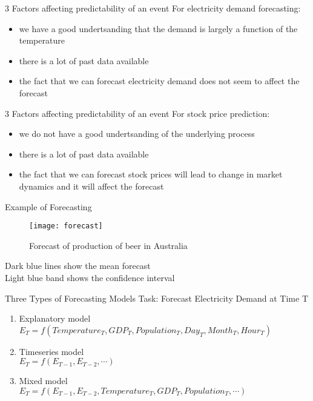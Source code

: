 \documentclass{beamer}
\begin{document}
\begin{frame}{3 Factors affecting predictability of an event}
For electricity demand forecasting:
\begin{itemize}
\item we have a good undertsanding that the demand is largely a function of the temperature
	\item there is a lot of past data available
	\pause
\item the fact that we can forecast electricity demand does not seem to affect the forecast
\end{itemize}
\end{frame}

\begin{frame}{3 Factors affecting predictability of an event}
For stock price prediction:
\begin{itemize}
\item we do not have a good undertsanding of the underlying process
	\item there is a lot of past data available
	\pause
\item the fact that we can forecast stock prices will lead to change in market dynamics and it will affect the forecast
\end{itemize}
\end{frame}

\begin{frame}{Example of Forecasting}
\begin{figure}
	\centering
	\texttt{[image: forecast]}
	\caption{Forecast of production of beer in Australia}
	\label{fig:forecast}
\end{figure}
Dark blue lines show the mean forecast \\
Light blue band shows the confidence interval

\end{frame}

\begin{frame}{Three Types of Forecasting Models}
Task: Forecast Electricity Demand at Time T

\begin{enumerate}
	\item Explanatory model \\$E_T = f(Temperature_T, GDP_T, Population_T, Day_T, Month_T, Hour_T)$
	\item Timeseries model \\ $E_T = f(E_{T-1}, E_{T-2}, \cdots)$
	\item Mixed model \\ $E_T = f(E_{T-1}, E_{T-2},Temperature_T, GDP_T, Population_T, \cdots )$
\end{enumerate}
\end{frame}
\end{document}
